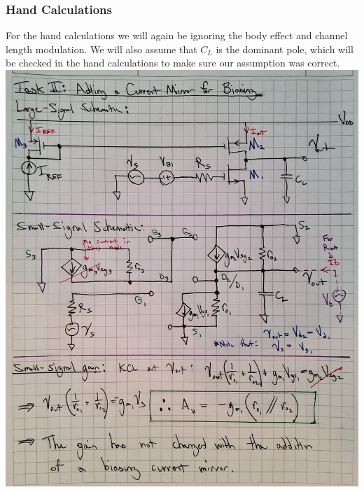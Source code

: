\documentclass[12pt, fleqn]{article}
\begin{document}
\subsubsection{Hand Calculations}
For the hand calculations we will again be ignoring the body effect and channel length modulation.  We will also assume that $C_L$ is the dominant pole, which will be checked in the hand calculations to make sure our assumption was correct.\\[0.25cm]
\includegraphics[scale=0.14, center]{p2b_1.jpg}\\
\newpage
\end{document}
